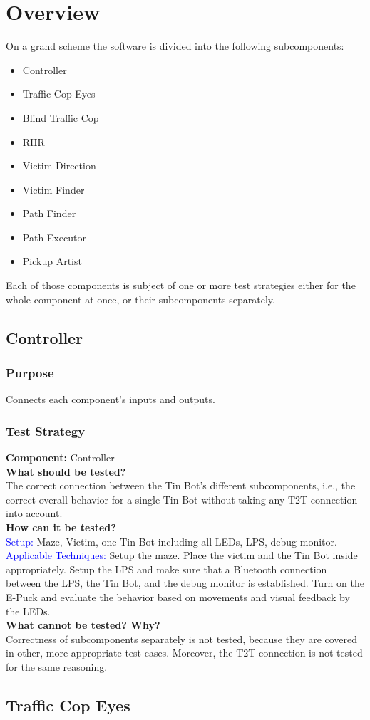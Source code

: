\documentclass[a4paper,parskip,headheight=38pt]{scrartcl} %
\newcommand{\teststrat}[5]{
    \subsubsection{Test Strategy}
	\textbf{Component:} #1 \\
	\noindent\textbf{What should be tested?} \\
    \noindent #2 \\
	\noindent\textbf{How can it be tested?} \\
    \noindent\textcolor{blue}{Setup:} #3 \\
    \noindent\textcolor{blue}{Applicable Techniques:} #4 \\
	\noindent\textbf{What cannot be tested? Why?} \\
    \noindent #5
}
\newcommand{\ie}{i.e.}
\begin{document}
\section{Overview}

On a grand scheme the software is divided into the following subcomponents:

\begin{itemize}
	\item Controller
	\item Traffic Cop Eyes
	\item Blind Traffic Cop 
	\item RHR
	\item Victim Direction
	\item Victim Finder
	\item Path Finder
	\item Path Executor
	\item Pickup Artist
\end{itemize}

Each of those components is subject of one or more test strategies either for
the whole component at once, or their subcomponents separately.
\subsection{Controller}
\subsubsection{Purpose}
	Connects each component's inputs and outputs. 
\teststrat{Controller}{
    The correct connection between the Tin Bot's different subcomponents, \ie,
    the correct overall behavior for a single Tin Bot without taking any T2T
    connection into account.
}{
    Maze, Victim, one Tin Bot including all LEDs, LPS, debug monitor.
}{
    Setup the maze. Place the victim and the Tin Bot inside appropriately. Setup
    the LPS and make sure that a Bluetooth connection between the LPS, the Tin
    Bot, and the debug monitor is established. Turn on the E-Puck and evaluate
    the behavior based on movements and visual feedback by the LEDs.
}{
    Correctness of subcomponents separately is not tested, because they are
    covered in other, more appropriate test cases. Moreover, the T2T connection
    is not tested for the same reasoning.
}
%
\subsection{Traffic Cop Eyes}
\end{document}
